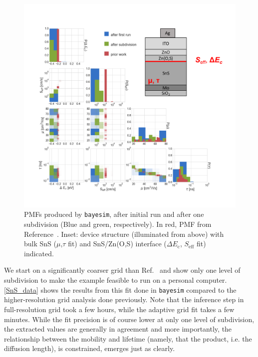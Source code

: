 \documentclass[aps,prl,amsmath,amssymb,superscriptaddress,notitlepage,groupedaddress]{revtex4-1}
\begin{document}
    \begin{figure}
      \includegraphics[width=0.8\columnwidth]{figure_4.png}
      \caption{PMFs produced by \texttt{bayesim}, after initial run and after one subdivision (Blue and green, respectively). In red, PMF from Reference~\cite{SnSJoule}. Inset: device structure (illuminated from above) with bulk SnS ($\mu$,$\tau$ fit) and SnS/Zn(O,S) interface ($\Delta E_\text{c}$, $S_{\text{eff}}$ fit) indicated.}
      \label{SnS_data}
    \end{figure}

    We start on a significantly coarser grid than Ref.~\cite{SnSJoule} and show only one level of subdivision to make the example feasible to run on a personal computer. \autoref{SnS_data} shows the results from this fit done in \texttt{bayesim} compared to the higher-resolution grid analysis done previously. Note that the inference step in full-resolution grid took a few hours, while the adaptive grid fit takes a few minutes. While the fit precision is of course lower at only one level of subdivision, the extracted values are generally in agreement and more importantly, the relationship between the mobility and lifetime (namely, that the product, i.e. the diffusion length), is constrained, emerges just as clearly.
\end{document}

